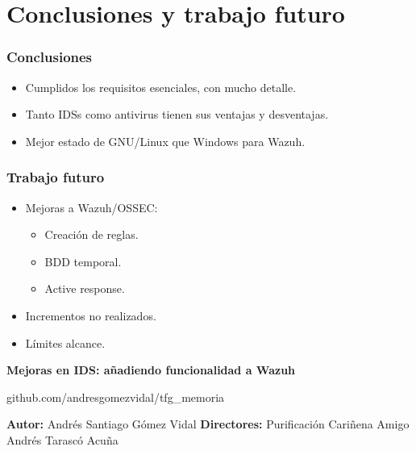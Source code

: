 \documentclass[a4paper,10pt]{beamer}
\newcommand{\linej}{\hfill\break}
\begin{document}
\section{Conclusiones y trabajo futuro}
\begin{frame}[fragile]
	\frametitle{Conclusiones}

	\begin{itemize}
		\item Cumplidos los requisitos esenciales, con mucho detalle. %
		\item Tanto IDSs como antivirus tienen sus ventajas y desventajas. %
		\item Mejor estado de GNU/Linux que Windows para Wazuh. %
	\end{itemize}
\end{frame}

\begin{frame}[fragile]
	\frametitle{Trabajo futuro}

	\begin{itemize}
		\item Mejoras a Wazuh/OSSEC:
		\begin{itemize}
			\item Creación de reglas. %
			\item BDD temporal. %
			\item Active response. %
		\end{itemize}
		\item Incrementos no realizados.
		\item Límites alcance.
	\end{itemize}
\end{frame}



\begin{frame}[fragile]
	\linej
	\linej
	\linej
	\large
	\centerline{\textbf{Mejoras en IDS: añadiendo funcionalidad a Wazuh}}
	\normalsize
	\linej
	\linej
	\centerline{github.com/andresgomezvidal/tfg\_memoria}
	\linej
	\linej
	\begin{multicols}{2}
	\textbf{Autor:}
	\linej
		Andrés Santiago Gómez Vidal
	\linej
	\columnbreak
	\linej
	\textbf{Directores:}
	\linej
		Purificación Cariñena Amigo
	\linej
		Andrés Tarascó Acuña
	\end{multicols}
\end{frame}
\end{document}
